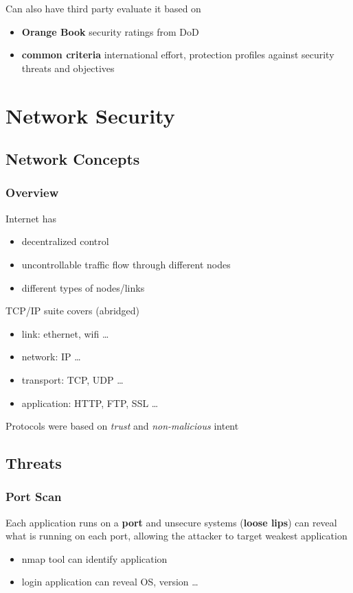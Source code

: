 \documentclass[]{article}
\theoremstyle{definition}
\begin{document}
	Can also have third party evaluate it based on
	\begin{itemize}
		\item \textbf{Orange Book} security ratings from DoD
		\item \textbf{common criteria} international effort, protection profiles against security threats and objectives
	\end{itemize}


	\section{Network Security}
	\subsection{Network Concepts}
	\subsubsection{Overview}
	Internet has
	\begin{itemize}
		\item decentralized control
		\item uncontrollable traffic flow through different nodes
		\item different types of nodes/links
	\end{itemize}
	TCP/IP suite covers (abridged)
	\begin{itemize}
		\item link: ethernet, wifi \dots
		\item network: IP \dots
		\item transport: TCP, UDP \dots
		\item application: HTTP, FTP, SSL \dots
	\end{itemize}
	Protocols were based on \textit{trust} and \textit{non-malicious} intent
	\subsection{Threats}
	\subsubsection{Port Scan}
	Each application runs on a \textbf{port} and unsecure systems (\textbf{loose lips}) can reveal what is running on each port, allowing the attacker to target weakest application
	\begin{itemize}
		\item nmap tool can identify application
		\item login application can reveal OS, version \dots
	\end{itemize}
\end{document}
